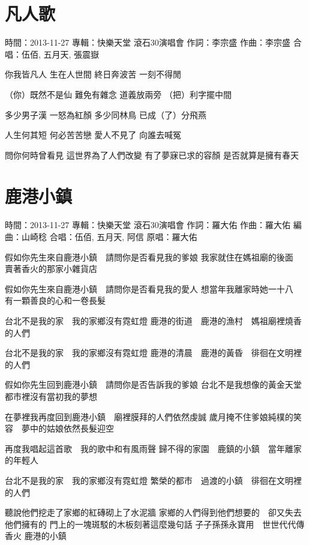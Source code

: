 \documentclass[UTF8,a4paper,oneside,twocolumn,12pt]{ctexbook}
\newcommand{\infopair}[2]{\textbullet #1：#2}
\newcommand{\zc}[1][伍佰]{\infopair{作詞}{#1}}
\newcommand{\zq}[1][伍佰]{\infopair{作曲}{#1}}
\newcommand{\bq}[1][伍佰]{\infopair{編曲}{#1}}
\newcommand{\zj}[1]{\infopair{專輯}{#1}}
\newcommand{\yc}[1]{\infopair{原唱}{#1}}
\newcommand{\sj}[1]{\infopair{時間}{#1}}
\newenvironment{info}{\begin{flushleft}\kaishu
	}
	{\end{flushleft}\normalsize\yahei\par}
\newenvironment{lyric}{
	}
{}
\begin{document}
\section{凡人歌}
\begin{info}
	\sj{2013-11-27}
	\zj{快樂天堂 滾石30演唱會}
	\zc[李宗盛]
	\zq[李宗盛]
	\infopair{合唱}{伍佰, 五月天, 張震嶽}
\end{info}
\begin{lyric}
	你我皆凡人  生在人世間
	終日奔波苦  一刻不得閒

	（你）既然不是仙  難免有雜念
	道義放兩旁  （把）利字擺中間

	多少男子漢  一怒為紅顏
	多少同林鳥  已成（了）分飛燕

	人生何其短  何必苦苦戀
	愛人不見了  向誰去喊冤

	問你何時曾看見  這世界為了人們改變
	有了夢寐已求的容顏  是否就算是擁有春天
\end{lyric}

\section{鹿港小鎮}
\begin{info}
	\sj{2013-11-27}
	\zj{快樂天堂 滾石30演唱會}
	\zc[羅大佑]
	\zq[羅大佑]
	\bq[山崎稔]
	\infopair{合唱}{伍佰, 五月天, 阿信}
	\yc{羅大佑}
\end{info}
\begin{lyric}
	假如你先生來自鹿港小鎮　請問你是否看見我的爹娘
	我家就住在媽祖廟的後面　賣著香火的那家小雜貨店

	假如你先生來自鹿港小鎮　請問你是否看見我的愛人
	想當年我離家時她一十八　有一顆善良的心和一卷長髮

	台北不是我的家　我的家鄉沒有霓虹燈
	鹿港的街道　鹿港的漁村　媽祖廟裡燒香的人們

	台北不是我的家　我的家鄉沒有霓虹燈
	鹿港的清晨　鹿港的黃昏　徘徊在文明裡的人們

	假如你先生回到鹿港小鎮　請問你是否告訴我的爹娘
	台北不是我想像的黃金天堂　都市裡沒有當初我的夢想

	在夢裡我再度回到鹿港小鎮　廟裡膜拜的人們依然虔誠
	歲月掩不住爹娘純樸的笑容　夢中的姑娘依然長髮迎空

	再度我唱起這首歌　我的歌中和有風雨聲
	歸不得的家園　鹿鎮的小鎮　當年離家的年輕人

	台北不是我的家　我的家鄉沒有霓虹燈
	繁榮的都市　過渡的小鎮　徘徊在文明裡的人們

	聽說他們挖走了家鄉的紅磚砌上了水泥牆
	家鄉的人們得到他們想要的　卻又失去他們擁有的
	門上的一塊斑駁的木板刻著這麼幾句話
	子子孫孫永寶用　世世代代傳香火
	鹿港的小鎮
\end{lyric}
\end{document}
